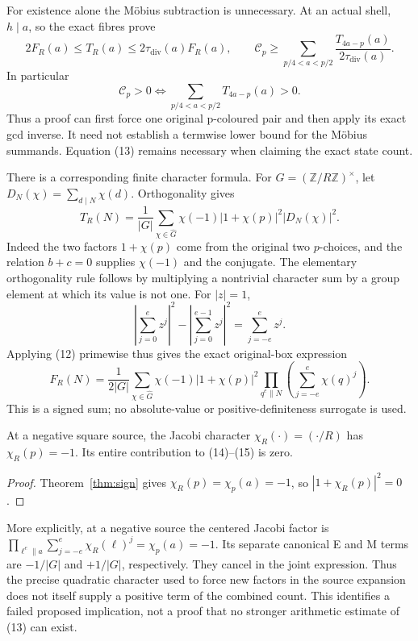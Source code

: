 For existence alone the M\"obius subtraction is unnecessary. At an actual shell,
$h\mid a$, so the exact fibres prove
\[
 2F_R(a)\le T_R(a)\le2\tau_{\mathrm{div}}(a)F_R(a),\qquad
 \mathcal C_p\ge\sum_{p/4<a<p/2}\frac{T_{4a-p}(a)}{2\tau_{\mathrm{div}}(a)}.
\]
In particular
\[
 \boxed{\mathcal C_p>0\iff\sum_{p/4<a<p/2}T_{4a-p}(a)>0.}         \tag{14b}
\]
Thus a proof can first force one original p-coloured pair and then apply its
exact gcd inverse. It need not establish a termwise lower bound for the M\"obius
summands. Equation (13) remains necessary when claiming the exact state count.

There is a corresponding finite character formula. For $G=(\mathbb Z/R\mathbb Z)^\times$,
let $D_N(\chi)=\sum_{d\mid N}\chi(d)$. Orthogonality gives
\[
 T_R(N)=\frac1{|G|}\sum_{\chi\in\widehat G}
 \chi(-1)|1+\chi(p)|^2|D_N(\chi)|^2.                      \tag{14}
\]
Indeed the two factors $1+\chi(p)$ come from the original two $p$-choices,
and the relation $b+c=0$ supplies $\chi(-1)$ and the conjugate. The elementary
orthogonality rule follows by multiplying a nontrivial character sum by a group
element at which its value is not one.
For $|z|=1$,
\[
 \left|\sum_{j=0}^e z^j\right|^2-
 \left|\sum_{j=0}^{e-1}z^j\right|^2=\sum_{j=-e}^e z^j.
\]
Applying (12) primewise thus gives the exact original-box expression
\[
 F_R(N)=\frac1{2|G|}\sum_{\chi\in\widehat G}\chi(-1)|1+\chi(p)|^2
 \prod_{q^e\parallel N}\left(\sum_{j=-e}^e\chi(q)^j\right). \tag{15}
\]
This is a signed sum; no absolute-value or positive-definiteness surrogate is used.

\begin{corollary}
At a negative square source, the Jacobi character $\chi_R(\cdot)=(\cdot/R)$
has $\chi_R(p)=-1$. Its entire contribution to (14)--(15) is zero.
\end{corollary}
\begin{proof}
Theorem~\ref{thm:sign} gives $\chi_R(p)=\chi_p(a)=-1$, so
$|1+\chi_R(p)|^2=0$.
\end{proof}
More explicitly, at a negative source the centered Jacobi factor is
$\prod_{\ell^e\parallel a}\sum_{j=-e}^e\chi_R(\ell)^j=\chi_p(a)=-1$.
Its separate canonical E and M terms are $-1/|G|$ and $+1/|G|$, respectively.
They cancel in the joint expression. Thus the precise quadratic character used
to force new factors in the source expansion does not itself supply a positive
term of the combined count. This
identifies a failed proposed implication, not a proof that no stronger arithmetic
estimate of (13) can exist.

